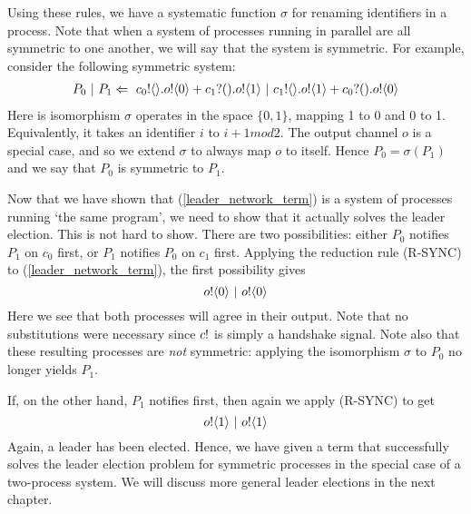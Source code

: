 Using these rules, we have a systematic function $\sigma$ for renaming identifiers in a process.  Note that when a system of processes running in parallel are all symmetric to one another, we will say that the system is symmetric.
For example, consider the following symmetric system:
\begin{align}
	P_0\ |\  P_1 \Leftarrow\  {c_0}!\langle{}\rangle. {o}!\langle{0}\rangle + {c_1}?({}). {o}!\langle{1}\rangle \ |\  {c_1}!\langle{}\rangle. {o}!\langle{1}\rangle + {c_0}?({}). {o}!\langle{0}\rangle
	\label{leader_network_term}	
\end{align}
Here is isomorphism $\sigma$ operates in the space $\{0,1\}$, mapping 1 to 0 and 0 to 1.  
Equivalently, it takes an identifier $i$ to $i+1 mod 2$.
The output channel $o$ is a special case, and so we extend $\sigma$ to always map $o$ to itself.
Hence $P_0 = \sigma(P_1)$ and we say that $P_0$ is symmetric to $P_1$.

Now that we have shown that (\ref{leader_network_term}) is a system of processes running `the same program', we need to show that it actually solves the leader election.  This is not hard to show.  There are two possibilities: either $P_0$ notifies $P_1$ on $c_0$ first, or $P_1$ notifies $P_0$ on $c_1$ first.  Applying the reduction rule (R-SYNC) to (\ref{leader_network_term}), the first possibility gives
\[
	 {o}!\langle{0}\rangle \ |\  {o}!\langle{0}\rangle	
\]
Here we see that both processes will agree in their output.  Note that no substitutions were necessary since ${c}!{}$ is simply a handshake signal.  Note also that these resulting processes are \emph{not} symmetric: applying the isomorphism $\sigma$ to $P_0$ no longer yields $P_1$.

If, on the other hand, $P_1$ notifies first, then again we apply (R-SYNC) to get
\[
	{o}!\langle{1}\rangle \ |\  {o}!\langle{1}\rangle
\]
Again, a leader has been elected.
Hence, we have given a term that successfully solves the leader election problem for symmetric processes in the special case of a two-process system.  We will discuss more general leader elections in the next chapter.